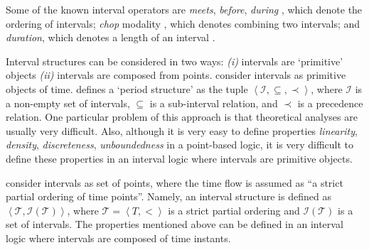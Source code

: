 \documentclass[11pt]{article}
\begin{document}
Some of the known interval operators are \emph{meets}, \emph{before}, \emph{during} \cite{All83}, which denote the ordering of intervals; \emph{chop} modality \cite{Ven91}, which denotes combining two intervals; and \emph{duration}, which denotes a length of an interval \cite{CH04}.

Interval structures can be considered in two ways: \emph{(i)} intervals are `primitive' objects \emph{(ii)} intervals are composed from points. \cite{vB91,MSV02,Vit05} consider intervals as primitive objects of time. \cite{vB91} defines  a `period structure' as the tuple $\left\langle \mathcal{I},\subseteq,\prec\right\rangle $, where $\mathcal{I}$ is a non-empty set of intervals, $\subseteq$ is a sub-interval relation, and $\prec$ is a precedence relation.
One particular problem of this approach is that theoretical analyses are usually very difficult. Also, although it is very easy to define properties  \emph{linearity}, \emph{density}, \emph{discreteness}, \emph{unboundedness} in a point-based logic, it is very difficult to define these properties in an interval logic where intervals are primitive objects. 

\cite{GMS04,HS91,Ven91} consider intervals as set of points, where the time flow is assumed as ``a strict partial ordering of time points''. Namely, an interval structure is defined as $\left\langle \mathcal{T},\mathcal{I}(\mathcal{T})\right\rangle$, where $\mathcal{T}=\left\langle T,<\right\rangle $ is a strict partial ordering and $\mathcal{I}(\mathcal{T})$ is a set of intervals. The properties mentioned above can be defined in an interval logic where intervals are composed of time instants. 
\end{document}
